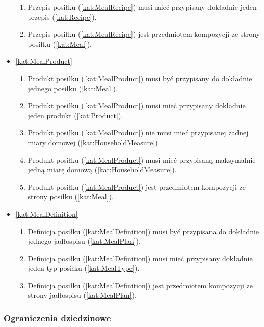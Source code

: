 \begin{itemize}[label={\textbf{Reguły dla}}, wide, labelwidth=!, labelindent=0pt]
\begin{enumerate}[label={\textbf{REG/4/\protect\twodigits{\arabic{enumi}}}}, wide, labelwidth=!, align=left, leftmargin=3cm, resume]
        \item Przepis posiłku (\ref{kat:MealRecipe}) musi mieć przypisany dokładnie jeden przepis (\ref{kat:Recipe}).
        \item Przepis posiłku (\ref{kat:MealRecipe}) jest przedmiotem kompozycji ze strony posiłku (\ref{kat:Meal}).
    \end{enumerate}
    \item\ref{kat:MealProduct}\mynobreakpar
    \begin{enumerate}[label={\textbf{REG/4/\protect\twodigits{\arabic{enumi}}}}, wide, labelwidth=!, align=left, leftmargin=3cm, resume]
        \item Produkt posiłku (\ref{kat:MealProduct}) musi być przypisany do dokładnie jednego posiłku (\ref{kat:Meal}).
        \item Produkt posiłku (\ref{kat:MealProduct}) musi mieć przypisany dokładnie jeden produkt (\ref{kat:Product}).
        \item Produkt posiłku (\ref{kat:MealProduct}) nie musi mieć przypisanej żadnej miary domowej (\ref{kat:HouseholdMeasure}).
        \item Produkt posiłku (\ref{kat:MealProduct}) musi mieć przypisaną maksymalnie jedną miarę domową (\ref{kat:HouseholdMeasure}).
        \item Produkt posiłku (\ref{kat:MealProduct}) jest przedmiotem kompozycji ze strony posiłku (\ref{kat:Meal}).
    \end{enumerate}
    \item\ref{kat:MealDefinition}\mynobreakpar
    \begin{enumerate}[label={\textbf{REG/4/\protect\twodigits{\arabic{enumi}}}}, wide, labelwidth=!, align=left, leftmargin=3cm, resume]
        \item Definicja posiłku (\ref{kat:MealDefinition}) musi być przypisana do dokładnie jednego jadłospisu (\ref{kat:MealPlan}).
        \item Definicja posiłku (\ref{kat:MealDefinition}) musi mieć przypisany dokładnie jeden typ posiłku (\ref{kat:MealType}).
        \item Definicja posiłku (\ref{kat:MealDefinition}) jest przedmiotem kompozycji ze strony jadłospisu (\ref{kat:MealPlan}).
    \end{enumerate}
\end{itemize}

\subsubsection{Ograniczenia dziedzinowe}\label{subsubsec:database:mealplans:restrictions}

